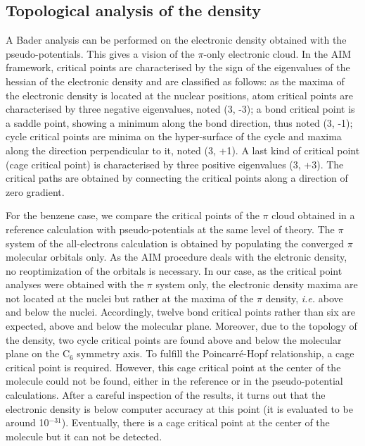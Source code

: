 \documentclass[12pt]{article}
\begin{document}
\subsection*{\sffamily \large Topological analysis of the density}
A Bader analysis can be performed on the electronic density obtained with the pseudo-potentials.\cite{AIM}
This gives a vision of the $\pi$-only electronic cloud.
In the AIM framework, critical points are characterised by the sign of the eigenvalues of the hessian of 
the electronic density and are classified as follows:
as the maxima of the electronic density is located at the nuclear positions,
atom critical points are characterised by three negative eigenvalues, noted (3, -3);
a bond critical point is a saddle point, showing a minimum along the bond direction,
thus noted (3, -1); cycle critical points are minima on the hyper-surface of the cycle
and maxima along the direction perpendicular to it, noted (3, +1).
A last kind of critical point (cage critical point) is characterised by three positive eigenvalues
(3, +3).
The critical paths are obtained by connecting the critical points along a direction of zero gradient.

For the benzene case, we compare the critical points of the $\pi$ cloud obtained in a reference calculation
with pseudo-potentials at the same level of theory.
The $\pi$ system of the all-electrons calculation is obtained  by populating the converged $\pi$ molecular orbitals only.
As the AIM procedure deals with the elctronic density, no reoptimization of the orbitals is necessary.
In our case, as the critical point analyses were obtained
with the $\pi$ system only, the electronic density maxima are not
located at the nuclei but rather at the maxima of the $\pi$ density, 
\emph{i.e.} above and below the nuclei. %
Accordingly, twelve bond critical points rather than six are expected,
above and below the molecular plane.
Moreover, due to the topology of the density, two cycle critical points are found above and below the molecular
plane on the C$_6$ symmetry axis.
To fulfill the Poincarré-Hopf relationship, a cage critical point is required. However, this cage critical point 
at the center of the molecule could not be found, either in the reference or in the pseudo-potential 
calculations.
After a careful inspection of the results, it turns out that the electronic density
is below computer accuracy at this point (it is evaluated to be around 10$^{-31}$).
Eventually, there is a cage critical point at the center of
the molecule but it can not be detected.
\end{document}

